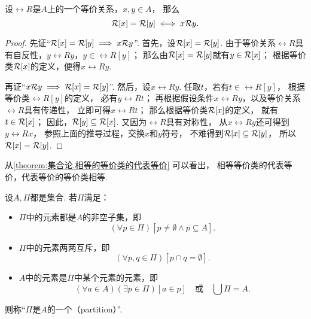 \begin{lemma}\label{theorem:集合论.相等的等价类的代表等价}
设\(\rel{R}\)是\(A\)上的一个等价关系，\(x,y \in A\)，
那么\begin{equation*}
	\EquivalenceClassBH{x}[\rel{R}] = \rel{R}[y]
	\iff
	x \rel{R} y.
\end{equation*}
\begin{proof}
先证“\(
	\EquivalenceClassBH{x}[\rel{R}] = \EquivalenceClassBH{y}[\rel{R}]
	\implies
	x \rel{R} y
\)”.
首先，设\(\EquivalenceClassBH{x}[\rel{R}] = \rel{R}[y]\).
由于等价关系\(\rel{R}\)具有自反性，\(y \rel{R} y\)，\(y \in \rel{R}[y]\)；
那么由\(\EquivalenceClassBH{x}[\rel{R}] = \rel{R}[y]\)就有\(y \in \EquivalenceClassBH{x}[\rel{R}]\)；
根据等价类\(\EquivalenceClassBH{x}[\rel{R}]\)的定义，便得\(x \rel{R} y\).

再证“\(
	x \rel{R} y
	\implies
	\EquivalenceClassBH{x}[\rel{R}] = \EquivalenceClassBH{y}[\rel{R}]
\)”.
然后，设\(x \rel{R} y\).
任取\(t\)，若有\(t \in \rel{R}[y]\)，
根据等价类\(\rel{R}[y]\)的定义，
必有\(y \rel{R} t\)；
再根据假设条件\(x \rel{R} y\)，以及等价关系\(\rel{R}\)具有传递性，
立即可得\(x \rel{R} t\)；
那么根据等价类\(\EquivalenceClassBH{x}[\rel{R}]\)的定义，
就有\(t \in \EquivalenceClassBH{x}[\rel{R}]\)；
因此，\(\rel{R}[y] \subseteq \EquivalenceClassBH{x}[\rel{R}]\).
又因为\(\rel{R}\)具有对称性，
从\(x \rel{R} y\)还可得到\(y \rel{R} x\)，
参照上面的推导过程，交换\(x\)和\(y\)符号，
不难得到\(\EquivalenceClassBH{x}[\rel{R}] \subseteq \rel{R}[y]\)，
所以\(\EquivalenceClassBH{x}[\rel{R}] = \rel{R}[y]\).
\end{proof}
\end{lemma}
从\cref{theorem:集合论.相等的等价类的代表等价} 可以看出，
相等等价类的代表等价，代表等价的等价类相等.

\begin{definition}\label{definition:集合论.划分的定义}
设\(A,\Pi\)都是集合.
若\(\Pi\)满足：
\begin{itemize}
	\item \(\Pi\)中的元素都是\(A\)的非空子集，即\begin{equation*}
		(\forall p \in \Pi)
		[
			p \neq \emptyset
			\land
			p \subseteq A
		].
	\end{equation*}

	\item \(\Pi\)中的元素两两互斥，即\begin{equation*}
		(\forall p,q \in \Pi)[p \cap q = \emptyset].
	\end{equation*}

	\item \(A\)中的元素是\(\Pi\)中某个元素的元素，即\begin{equation*}
		(\forall a \in A)
		(\exists p \in \Pi)
		[a \in p]
		\quad\text{或}\quad
		\bigcup\Pi = A.
	\end{equation*}
\end{itemize}
则称“\(\Pi\)是\(A\)的一个（partition）”.
\end{definition}

